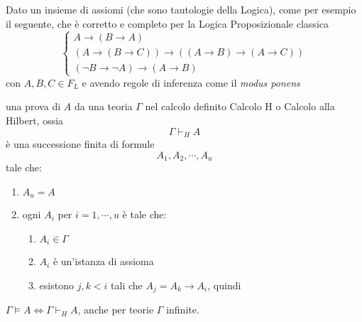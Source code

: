 \begin{defi}
        Dato un insieme di assiomi (che sono tautologie della Logica), come per esempio 
il seguente, che è corretto e completo per la Logica Proposizionale classica
$$
\begin{cases}
        A \rightarrow (B \rightarrow A) \\
        (A \rightarrow (B \rightarrow C)) \rightarrow ((A \rightarrow B) \rightarrow (A \rightarrow C)) \\
        ( \neg B \rightarrow \neg A) \rightarrow (A \rightarrow B) 
\end{cases}
$$
con $A, B, C \in F_L$ e avendo regole di inferenza come il \textit{modus ponens} 

\begin{prooftree}
\end{prooftree}

una prova di $A$ da una teoria $\Gamma$ nel calcolo definito Calcolo H o 
Calcolo alla Hilbert, ossia 
$$
\Gamma \vdash_H A
$$
è una successione finita di formule 
$$
A_1, A_2, \cdots, A_u
$$
tale che: 
\begin{enumerate}
        \item $A_u = A$ 
        \item ogni $A_i$ per $i = 1, \cdots, u$ è tale che: 
                \begin{enumerate}
                        \item $A_i \in \Gamma$
                        \item $A_i$ è un'istanza di assioma 
                        \item esistono $j,k < i$ tali che $A_j= A_k \rightarrow A_i$, quindi 
                                \begin{prooftree}
                                \end{prooftree}
                \end{enumerate}
\end{enumerate}
\end{defi}

\begin{teo}
$\Gamma \models A \iff \Gamma \vdash_H A$, 
anche per teorie $\Gamma$ infinite. 
\end{teo}


